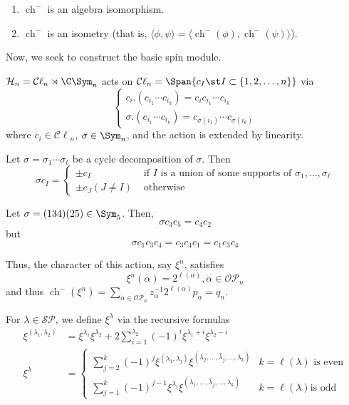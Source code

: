 \documentclass[11pt,leqno,oneside]{amsbook}
\renewcommand{\H}{\mathcal{H}}
\newcommand{\Cl}{\mathcal{C\ell}} %
\newcommand{\OP}{\mathcal{OP}} %
\newcommand{\SP}{\mathcal{SP}} %
\DeclareMathOperator{\ch}{ch}
\numberwithin{thm}{section}
\begin{document}
\begin{prop}
  \begin{enumerate}
  \item \(\ch^-\) is an algebra isomorphism.
  \item \(\ch^-\) is an isometry (that is, \(\langle \phi,\psi \rangle
    = \langle \ch^-(\phi), \ch^-(\psi) \rangle\)).
  \end{enumerate}
\end{prop}
Now, we seek to construct the basic spin module.
\begin{prop}
  \(\H_n = \Cl_n \rtimes \C \Sym_n\) acts on \(\Cl_n = \Span\{c_I \st
  I \subset \{1,2,\ldots,n\}\}\) via \[
    \begin{cases}
      c_i.(c_{i_1} \cdots c_{i_k}) = c_i c_{i_1} \cdots c_{i_k} \\
      \sigma.(c_{i_1} \cdots c_{i_k}) = c_{\sigma(i_1)} \cdots
      c_{\sigma(i_k)} 
    \end{cases}
  \]
  where \(c_i \in \Cl_n\), \(\sigma \in \Sym_n\), and the action is
  extended by linearity. 
\end{prop}
\begin{prop}
  Let \(\sigma = \sigma_1 \cdots \sigma_\ell\) be a cycle
  decomposition of \(\sigma\). Then \[
    \sigma c_I =
    \begin{cases}
      \pm c_I & \text{ if }I\text{ is a union of some supports of
      }\sigma_1, \ldots, \sigma_\ell \\
      \pm c_J (J \neq I) & \text{ otherwise}
    \end{cases}
  \]
\end{prop}
\begin{example}
  Let \(\sigma = (134)(25) \in \Sym_5\). Then, \[
    \sigma c_3 c_5 = c_4 c_2
  \]
  but \[
    \sigma c_1 c_3 c_4 = c_3 c_4 c_1 = c_1 c_3 c_4
  \]
\end{example}
Thus, the character of this action, say \(\xi^n\), satisfies \[
  \xi^n(\alpha) = 2^{\ell(\alpha)}, \alpha \in \OP_n
\]
and thus \(\ch^-(\xi^n) = \sum_{\alpha \in \OP_n} z_\alpha^{-1}
2^{\ell(\alpha)} p_\alpha = q_n\).
\begin{defn}
 For \(\lambda \in \SP\), we define \(\xi^\lambda\) via the recursive
 formulas
 \begin{align*}
   \xi^{(\lambda_1, \lambda_2)} & = \xi^{\lambda_1} \xi^{\lambda_2} + 2
   \sum_{i=1}^{\lambda_2}(-1)^i \xi^{\lambda_1 + i} \xi^{\lambda_2 -
   i} \\
   \xi^\lambda & =
   \begin{cases}
     \sum_{j=2}^k (-1)^j \xi^{(\lambda_1,\lambda_j)} \xi^{(\lambda_2,
       \ldots, \hat{\lambda}_j, \ldots, \lambda_k)} & k =
     \ell(\lambda) \text{ is even} \\
     \sum_{j=1}^k (-1)^{j-1} \xi^{\lambda_j} \xi^{(\lambda_1, \ldots,
       \hat{\lambda}_j, \ldots, \lambda_k)} & k = \ell(\lambda) \text{
     is odd}
   \end{cases}
 \end{align*}
\end{defn}
\end{document}
